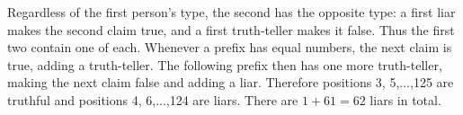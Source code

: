 Regardless of the first person's type, the second has the opposite type: a first liar makes the second claim true, and a first truth-teller makes it false. Thus the first two contain one of each. Whenever a prefix has equal numbers, the next claim is true, adding a truth-teller. The following prefix then has one more truth-teller, making the next claim false and adding a liar. Therefore positions 3, 5,...,125 are truthful and positions 4, 6,...,124 are liars. There are $1+61=\boxed{62}$ liars in total.
